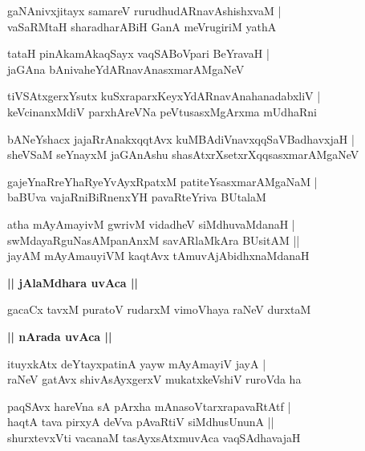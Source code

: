 \documentclass[twoside,12pt,openright]{book}
\newcounter{shloka}[chapter]
\def\uvaca#1{\centerline{{\large\textbf{#1}}}}
\begin{document}
\begin{shloka}%
gaNAnivxjitayx samareV rurudhudARnavAshishxvaM |\\
vaSaRMtaH sharadharABiH GanA meVrugiriM yathA
\end{shloka}

\begin{shloka}%
tataH pinAkamAkaqSayx vaqSABoVpari BeYravaH |\\
jaGAna bAnivaheYdARnavAnasxmarAMgaNeV 
\end{shloka}

\begin{shloka}%
tiVSAtxgerxYsutx kuSxraparxKeyxYdARnavAnahanadabxliV |\\
keVcinanxMdiV parxhAreVNa peVtusasxMgArxma mUdhaRni
\end{shloka}

\begin{shloka}%
bANeYshacx jajaRrAnakxqqtAvx kuMBAdiVnavxqqSaVBadhavxjaH |\\
sheVSaM seYnayxM jaGAnAshu shasAtxrXsetxrXqqsasxmarAMgaNeV 
\end{shloka}

\begin{shloka}%
gajeYnaRreYhaRyeYvAyxRpatxM patiteYsasxmarAMgaNaM |\\
baBUva vajaRniBiRnenxYH pavaRteYriva BUtalaM
\end{shloka}

\begin{shloka}%
atha mAyAmayivM gwrivM vidadheV siMdhuvaMdanaH |\\
swMdayaRguNasAMpanAnxM savARlaMkAra BUsitAM ||\\
jayAM mAyAmauyiVM kaqtAvx tAmuvAjAbidhxnaMdanaH
\end{shloka}

\uvaca{|| jAlaMdhara uvAca ||}

\begin{shloka}%
gacaCx tavxM puratoV rudarxM vimoVhaya raNeV durxtaM 
\end{shloka}

\uvaca{|| nArada uvAca ||}

\begin{shloka}%
ituyxkAtx deYtayxpatinA yayw mAyAmayiV jayA |\\
raNeV gatAvx shivAsAyxgerxV mukatxkeVshiV ruroVda ha 
\end{shloka}

\begin{shloka}%
paqSAvx hareVna  sA pArxha mAnasoVtarxrapavaRtAtf |\\
haqtA tava pirxyA deVva pAvaRtiV siMdhusUnunA ||\\
shurxtevxVti vacanaM tasAyxsAtxmuvAca vaqSAdhavajaH
\end{shloka}
\end{document}
